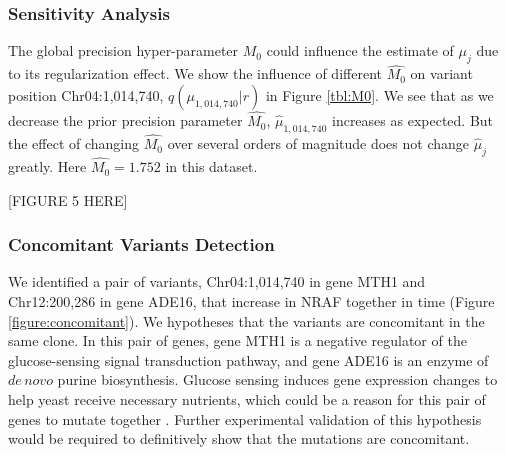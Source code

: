 \documentclass{bmcart}
\begin{document}
\subsubsection{Sensitivity Analysis}
The global precision hyper-parameter $M_0$ could influence the estimate of $\mu_j$ due to its regularization effect.
We show the influence of different $\hat{M_0}$ on variant position Chr04:1,014,740, $q(\mu_{1,014,740}|r)$ in Figure \ref{tbl:M0}.
We see that as we decrease the prior precision parameter $\hat{M_0}$, $\hat{\mu}_{1,014,740}$ increases as expected.
But the effect of changing $\hat{M_0}$ over several orders of magnitude does not change $\hat{\mu}_j$ greatly.
Here $\hat{M_0} = 1.752$ in this dataset.

\vspace{2em}
\begin{center}
[FIGURE 5 HERE]  
\end{center}
\vspace{2em}


\subsubsection{Concomitant Variants Detection}
We identified a pair of variants, Chr04:1,014,740 in gene MTH1 and Chr12:200,286 in gene ADE16, that increase in NRAF together in time (Figure \ref{figure:concomitant}).
We hypotheses that the variants are concomitant in the same clone.
In this pair of genes, gene MTH1 is a negative regulator of the glucose-sensing signal transduction pathway, and gene ADE16 is an enzyme of $\mathit{de\, novo}$ purine biosynthesis.
Glucose sensing induces gene expression changes to help yeast receive necessary nutrients, which could be a reason for this pair of genes to mutate together \cite{johnston1999feasting}.
Further experimental validation of this hypothesis would be required to definitively show that the mutations are concomitant.
\end{document}
